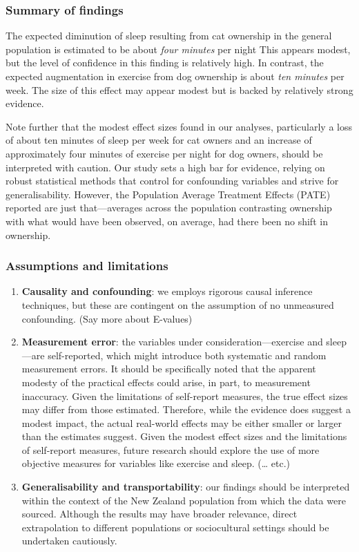 \documentclass[
  singlecolumn,
  9pt]{article}
\begin{document}
\subsubsection{Summary of findings}\label{summary-of-findings}

The expected diminution of sleep resulting from cat ownership in the
general population is estimated to be about \emph{four minutes} per
night This appears modest, but the level of confidence in this finding
is relatively high. In contrast, the expected augmentation in exercise
from dog ownership is about \emph{ten minutes} per week. The size of
this effect may appear modest but is backed by relatively strong
evidence.

Note further that the modest effect sizes found in our analyses,
particularly a loss of about ten minutes of sleep per week for cat
owners and an increase of approximately four minutes of exercise per
night for dog owners, should be interpreted with caution. Our study sets
a high bar for evidence, relying on robust statistical methods that
control for confounding variables and strive for generalisability.
However, the Population Average Treatment Effects (PATE) reported are
just that---averages across the population contrasting ownership with
what would have been observed, on average, had there been no shift in
ownership.

\subsubsection{Assumptions and
limitations}\label{assumptions-and-limitations}

\begin{enumerate}
\def\labelenumi{\arabic{enumi}.}
\item
  \textbf{Causality and confounding}: we employs rigorous causal
  inference techniques, but these are contingent on the assumption of no
  unmeasured confounding. (Say more about E-values)
\item
  \textbf{Measurement error}: the variables under
  consideration---exercise and sleep---are self-reported, which might
  introduce both systematic and random measurement errors. It should be
  specifically noted that the apparent modesty of the practical effects
  could arise, in part, to measurement inaccuracy. Given the limitations
  of self-report measures, the true effect sizes may differ from those
  estimated. Therefore, while the evidence does suggest a modest impact,
  the actual real-world effects may be either smaller or larger than the
  estimates suggest. Given the modest effect sizes and the limitations
  of self-report measures, future research should explore the use of
  more objective measures for variables like exercise and sleep.
  (\ldots{} etc.)
\item
  \textbf{Generalisability and transportability}: our findings should be
  interpreted within the context of the New Zealand population from
  which the data were sourced. Although the results may have broader
  relevance, direct extrapolation to different populations or
  sociocultural settings should be undertaken cautiously.
\end{enumerate}
\end{document}

